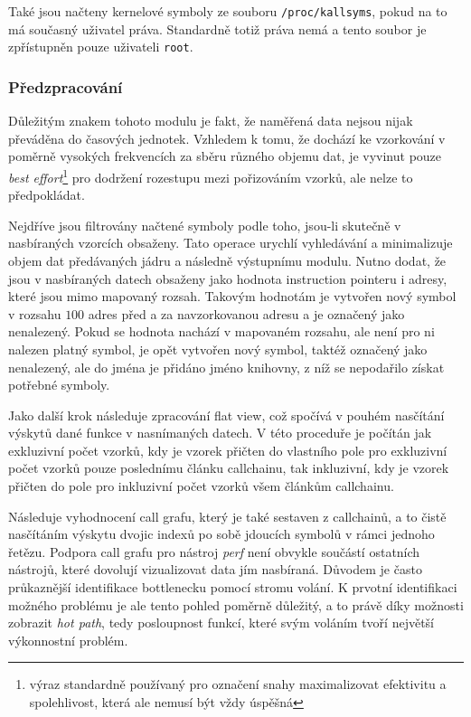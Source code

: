\documentclass[czech,BP]{thesiskiv}
\begin{document}
Také jsou načteny kernelové symboly ze souboru \texttt{/proc/kallsyms}, pokud na to má současný uživatel práva. Standardně totiž práva nemá a tento soubor je zpřístupněn pouze uživateli \texttt{root}.

\subsubsection*{Předzpracování}

Důležitým znakem tohoto modulu je fakt, že naměřená data nejsou nijak převáděna do časových jednotek. Vzhledem k tomu, že dochází ke vzorkování v poměrně vysokých frekvencích za sběru různého objemu dat, je vyvinut pouze \emph{best effort}\footnote{výraz standardně používaný pro označení snahy maximalizovat efektivitu a spolehlivost, která ale nemusí být vždy úspěšná} pro dodržení rozestupu mezi pořizováním vzorků, ale nelze to předpokládat.

Nejdříve jsou filtrovány načtené symboly podle toho, jsou-li skutečně v nasbíraných vzorcích obsaženy. Tato operace urychlí vyhledávání a minimalizuje objem dat předávaných jádru a následně výstupnímu modulu. Nutno dodat, že jsou v nasbíraných datech obsaženy jako hodnota instruction pointeru i adresy, které jsou mimo mapovaný rozsah. Takovým hodnotám je vytvořen nový symbol v rozsahu $100$ adres před a za navzorkovanou adresu a je označený jako nenalezený. Pokud se hodnota nachází v mapovaném rozsahu, ale není pro ni nalezen platný symbol, je opět vytvořen nový symbol, taktéž označený jako nenalezený, ale do jména je přidáno jméno knihovny, z níž se nepodařilo získat potřebné symboly.

Jako další krok následuje zpracování flat view, což spočívá v pouhém nasčítání výskytů dané funkce v nasnímaných datech. V této proceduře je počítán jak exkluzivní počet vzorků, kdy je vzorek přičten do vlastního pole pro exkluzivní počet vzorků pouze poslednímu článku callchainu, tak inkluzivní, kdy je vzorek přičten do pole pro inkluzivní počet vzorků všem článkům callchainu.

Následuje vyhodnocení call grafu, který je také sestaven z callchainů, a to čistě nasčítáním výskytu dvojic indexů po sobě jdoucích symbolů v rámci jednoho řetězu. Podpora call grafu pro nástroj \emph{perf} není obvykle součástí ostatních nástrojů, které dovolují vizualizovat data jím nasbíraná. Důvodem je často průkaznější identifikace bottlenecku pomocí stromu volání. K prvotní identifikaci možného problému je ale tento pohled poměrně důležitý, a to právě díky možnosti zobrazit \emph{hot path}, tedy posloupnost funkcí, které svým voláním tvoří největší výkonnostní problém.
\end{document}
